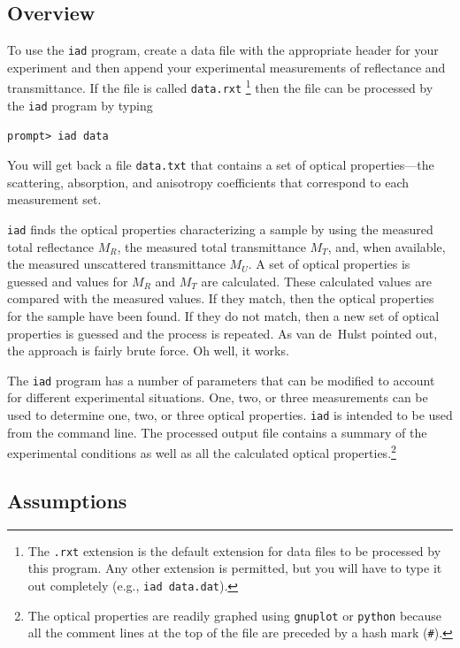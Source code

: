 \documentclass{article}
\newcommand\iadprog{\texttt{iad}}
\begin{document}
\subsection{Overview}
To use the \iadprog{} program, create a data file with
the appropriate header for your experiment and then append your
experimental measurements of reflectance and transmittance.  If the file is
called \texttt{data.rxt}%
\footnote{The \texttt{.rxt} extension is the default extension
for data files to be processed by this program.  Any other extension is permitted,
but you will have to type it out completely (e.g., \texttt{iad data.dat}).} 
then the file can be processed by the \iadprog{} program by typing
\begin{center}
\texttt{prompt> iad data}
\end{center}
You will get back a file \texttt{data.txt} that contains a set of optical
properties---the scattering, absorption, and anisotropy coefficients that
correspond to each measurement set.

\iadprog{} finds the optical properties characterizing a sample by using
the measured total reflectance $M_R$, the measured total transmittance $M_T$,
and, when available, the measured unscattered transmittance $M_U$.
A set of optical properties is guessed and values for $M_R$ and $M_T$ are
calculated.  These calculated values are compared with the measured values.
If they match, then the optical properties for the sample have been found.
If they do not match, then a new set of optical properties is guessed and the
process is repeated.  As van de~Hulst pointed out, the approach is fairly
brute force.  Oh well, it works.

The \iadprog{} program has a number of parameters that can be modified to 
account for
different experimental situations.  One, two, or three measurements can be used
to determine one, two, or three optical properties.  \iadprog{} is intended to
be used from the command line.  The processed output file contains a summary of
the experimental conditions as well as all the calculated optical
properties.\footnote{The optical properties are readily graphed using
\texttt{gnuplot} or \texttt{python} because all the comment lines at the
top of the file are preceded by a hash mark (\texttt{\#}).}

\subsection{Assumptions}
\end{document}
